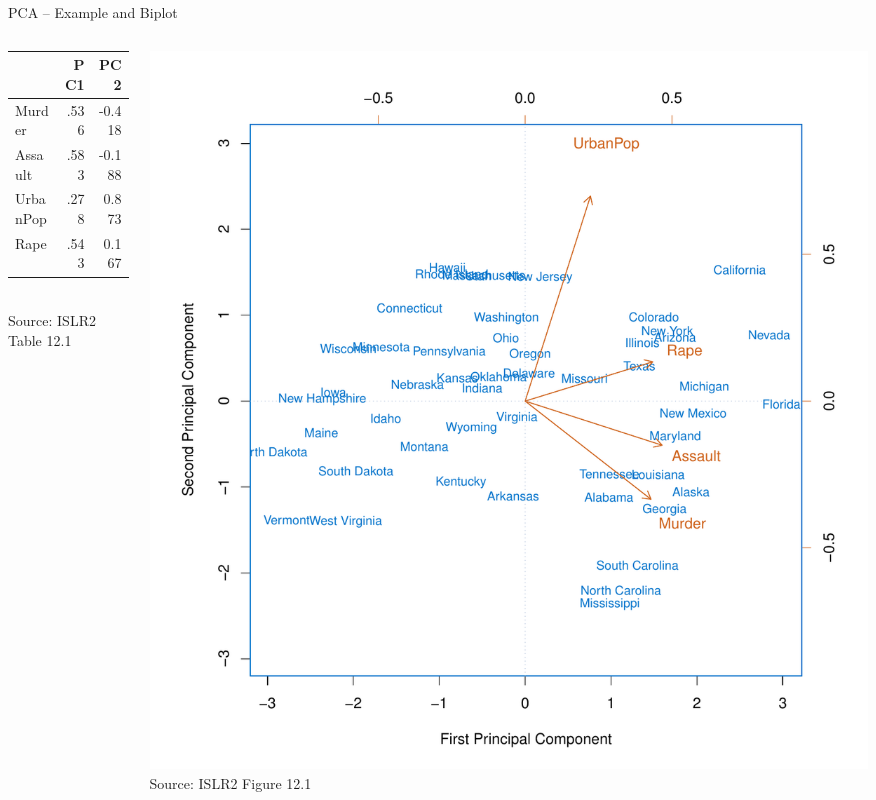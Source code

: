 \documentclass[ignorenonframetext,xcolor=x11names]{beamer}
\begin{document}
\begin{frame}{PCA -- Example and Biplot}
\begin{columns}
\begin{column}{0.3\textwidth}
\footnotesize
\begin{tabular}{l|r|r} \hline
          &  PC1 & PC2 \\ \hline
Murder    & .536  & -0.418 \\
Assault   & .583  & -0.188 \\
UrbanPop  & .278  & 0.873 \\ 
Rape      & .543 & 0.167 \\ \hline
\end{tabular} \\

\scriptsize Source: ISLR2 Table 12.1
\end{column}
\begin{column}{0.7\textwidth}
\includegraphics[width=\textwidth]{../class11/Figures_Chapters_7-13/Chapter12/12_1.pdf} \\

\scriptsize Source: ISLR2 Figure 12.1
\end{column}
\end{columns}
\end{frame}
\end{document}
